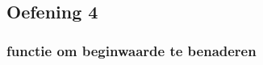 \documentclass[11pt]{article}
\begin{document}
    \begin{center}
    \end{center}
    { \hspace*{\fill} \\}
    
    \hypertarget{oefening-4}{%
\subsection{Oefening 4}\label{oefening-4}}

    \hypertarget{functie-om-beginwaarde-te-benaderen}{%
\subsubsection{functie om beginwaarde te
benaderen}\label{functie-om-beginwaarde-te-benaderen}}
\end{document}
